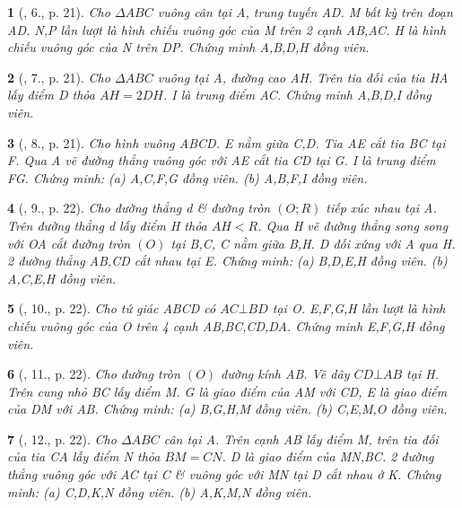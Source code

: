 \documentclass{article}
\newtheorem{baitoan}{}
\begin{document}
\begin{baitoan}[\cite{Thu_Chung_Viet_Minh_circ}, 6., p. 21]
	Cho $\Delta ABC$ vuông cân tại A, trung tuyến AD. M bất kỳ trên đoạn AD. N,P lần lượt là hình chiếu vuông góc của M trên 2 cạnh AB,AC. H là hình chiếu vuông góc của N trên DP. Chứng minh A,B,D,H đồng viên.
\end{baitoan}

\begin{baitoan}[\cite{Thu_Chung_Viet_Minh_circ}, 7., p. 21]
	Cho $\Delta ABC$ vuông tại A, đường cao AH. Trên tia đối của tia HA lấy điểm D thỏa $AH = 2DH$. I là trung điểm AC. Chứng minh A,B,D,I đồng viên.
\end{baitoan}

\begin{baitoan}[\cite{Thu_Chung_Viet_Minh_circ}, 8., p. 21]
	Cho hình vuông ABCD. E nằm giữa C,D. Tia AE cắt tia BC tại F. Qua A vẽ đường thẳng vuông góc với AE cắt tia CD tại G. I là trung điểm FG. Chứng minh: (a) A,C,F,G đồng viên. (b) A,B,F,I đồng viên.
\end{baitoan}

\begin{baitoan}[\cite{Thu_Chung_Viet_Minh_circ}, 9., p. 22]
	Cho đường thẳng d \& đường tròn $(O;R)$ tiếp xúc nhau tại A. Trên đường thẳng d lấy điểm H thỏa $AH < R$. Qua H vẽ đường thẳng song song với OA cắt đường tròn $(O)$ tại B,C, C nằm giữa B,H. D đối xứng với A qua H. 2 đường thẳng AB,CD cắt nhau tại E. Chứng minh: (a) B,D,E,H đồng viên. (b) A,C,E,H đồng viên.
\end{baitoan}

\begin{baitoan}[\cite{Thu_Chung_Viet_Minh_circ}, 10., p. 22]
	Cho tứ giác ABCD có $AC\bot BD$ tại O. E,F,G,H lần lượt là hình chiếu vuông góc của O trên 4 cạnh AB,BC,CD,DA. Chứng minh E,F,G,H đồng viên.
\end{baitoan}

\begin{baitoan}[\cite{Thu_Chung_Viet_Minh_circ}, 11., p. 22]
	Cho đường tròn $(O)$ đường kính AB. Vẽ dây $CD\bot AB$ tại H. Trên cung nhỏ BC lấy điểm M. G là giao điểm của AM với CD, E là giao điểm của DM với AB. Chứng minh: (a) B,G,H,M đồng viên. (b) C,E,M,O đồng viên.
\end{baitoan}

\begin{baitoan}[\cite{Thu_Chung_Viet_Minh_circ}, 12., p. 22]
	Cho $\Delta ABC$ cân tại A. Trên cạnh AB lấy điểm M, trên tia đối của tia CA lấy điểm N thỏa $BM = CN$. D là giao điểm của MN,BC. 2 đường thẳng vuông góc với AC tại C \& vuông góc với MN tại D cắt nhau ở K. Chứng minh: (a) C,D,K,N đồng viên. (b) A,K,M,N đồng viên.
\end{baitoan}
\end{document}
